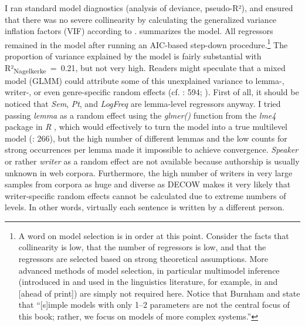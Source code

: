 \begin{styleMoutonText}
I ran standard model diagnostics (analysis of deviance, pseudo-R²), and ensured that there was no severe collinearity by calculating the generalized variance inflation factors (VIF) according to \citet{FoxMonette1992}.  summarizes the model. All regressors remained in the model after running an AIC-based step-down procedure.\footnote{A word on model selection is in order at this point. Consider the facts that collinearity is low, that the number of regressors is low, and that the regressors are selected based on strong theoretical assumptions. More advanced methods of model selection, in particular multimodel inference (introduced in \citealt{BurnhamAnderson2002} and used in the linguistics literature, for example, in \citealt{KupermanBresnan2012} and \citealt{BarthKapatsinski2014} [ahead of print]) are simply not required here. Notice that Burnham and \citet[4]{Anderson2002} state that “[s]imple models with only 1–2 parameters are not the central focus of this book; rather, we focus on models of more complex systems.”} The proportion of variance explained by the model is fairly substantial with R²\textsubscript{Nagelkerke}~=~0.21, but not very high. Readers might speculate that a mixed model (GLMM) could attribute some of this unexplained variance to lemma-, writer-, or even genre-specific random effects (cf. \citealt{KupermannBresnan2012}: 594; \citealt{Gries2015}). First of all, it should be noticed that \textit{Sem}, \textit{Pt}, and \textit{LogFreq} are lemma-level regressors anyway. I tried passing \textit{lemma} as a random effect using the \textit{glmer()} function from the \textit{lme4} package in \textit{R} \citep{BatesEtAl2015}, which would effectively to turn the model into a true multilevel model (\citealt{GelmanHill2006}: 266), but the high number of different lemmas and the low counts for strong occurrences per lemma made it impossible to achieve convergence. \textit{Speaker} or rather \textit{writer} as a random effect are not available because authorship is usually unknown in web corpora. Furthermore, the high number of writers in very large samples from corpora as huge and diverse as DECOW makes it very likely that writer-specific random effects cannot be calculated due to extreme numbers of levels. In other words, virtually each sentence is written by a different person.
\end{styleMoutonText}

